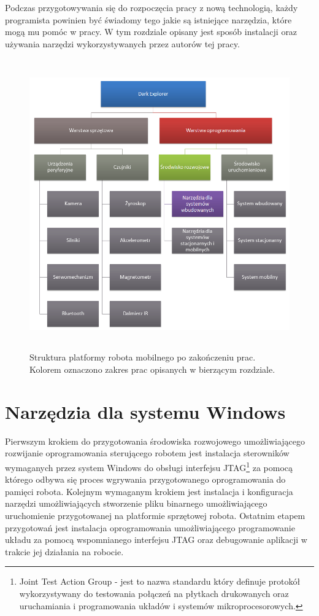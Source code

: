 Podczas przygotowywania się do rozpoczęcia pracy z nową technologią, każdy
programista powinien być świadomy tego jakie są istniejące narzędzia, które mogą
mu pomóc w pracy. W tym rozdziale opisany jest sposób instalacji oraz używania
narzędzi wykorzystywanych przez autorów tej pracy.

\begin{figure}[!ht]
 \centering
 \includegraphics[height=125mm]{../images/ch03/dark_explorer_platform_ide_embeded.png}
 \caption{Struktura platformy robota mobilnego po zakończeniu prac. Kolorem oznaczono zakres prac opisanych w bierzącym rozdziale.}
 \label{fig:DarkExplorerPlatformIDE}
\end{figure}

\section{Narzędzia dla systemu Windows}
\label{sec:embeded-win-tools}
Pierwszym krokiem do przygotowania środowiska rozwojowego umożliwiającego
rozwijanie oprogramowania sterującego robotem jest instalacja sterowników
wymaganych przez system Windows do obsługi interfejsu JTAG\footnote{Joint Test
Action Group - jest to nazwa standardu który definuje protokół wykorzystywany do
testowania połączeń na płytkach drukowanych oraz uruchamiania i programowania
układów i systemów mikroprocesorowych. } za pomocą którego odbywa się proces
wgrywania przygotowanego oprogramowania do pamięci robota. Kolejnym wymaganym
krokiem jest instalacja i konfiguracja narzędzi umożliwiających stworzenie pliku
binarnego umożliwiającego uruchomienie przygotowanej na platformie sprzętowej
robota. Ostatnim etapem przygotowań jest instalacja oprogramowania
umożliwiającego programowanie układu za pomocą wspomnianego interfejsu JTAG oraz
debugowanie aplikacji w trakcie jej działania na robocie.

